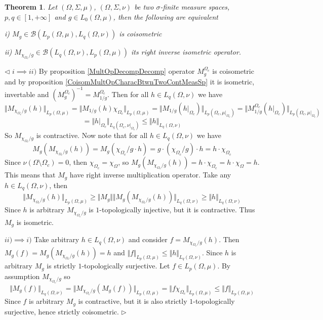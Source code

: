 \documentclass[12pt]{article}
\newtheorem{theorem}{Theorem}[subsection]
\newenvironment{proof}{\par $\triangleleft$}{$\triangleright$}
\begin{document}
\begin{theorem}\label{CoisomMultOpDescBtwnTwoMeasSp} Let $(\Omega,\Sigma,\mu)$, $(\Omega,\Sigma,\nu)$ be two $\sigma$-finite measure spaces, $p,q\in[1,+\infty]$ and $g\in L_0(\Omega,\mu)$, then the following are equivalent

i) $M_g\in\mathcal{B}(L_p(\Omega,\mu),L_q(\Omega,\nu))$ is coisometric

ii) $M_{\chi_{\Omega_c}/g}\in\mathcal{B}(L_q(\Omega,\nu), L_p(\Omega,\mu))$ its right inverse isometric operator.
\end{theorem}
\begin{proof}
$i\implies ii)$ By proposition \ref{MultOpDecompDecomp} operator $M_g^{\Omega_c}$ is coisometric and by proposition \ref{CoisomMultOpCharacBtwnTwoContMeasSp} it is isometric, invertable and $(M_g^{\Omega_c})^{-1}=M_{1/g}^{\Omega_c}$. Then for all $h\in L_q(\Omega,\nu)$ we have
$$
\Vert M_{\chi_{\Omega_c}/g}(h)\Vert_{L_p(\Omega,\mu)}=
\Vert M_{1/g}(h)\chi_{\Omega_c}\Vert_{L_p(\Omega,\mu)}=
\Vert M_{1/g}(h|_{\Omega_c})\Vert_{L_p(\Omega_c,\mu|_{\Omega_c})}=
\Vert M_{1/g}^{\Omega_c}(h|_{\Omega_c})\Vert_{L_p(\Omega_c,\mu|_{\Omega_c})}
$$
$$
=\Vert h|_{\Omega_c}\Vert_{L_q(\Omega_c,\nu|_{\Omega_c})}
\leq\Vert h\Vert_{L_q(\Omega,\nu)}
$$
So $M_{\chi_{\Omega_c}/g}$ is contractive. Now note that for all $h\in L_q(\Omega,\nu)$ we have
$$
M_g(M_{\chi_{\Omega_c}/g}(h))
=M_g(\chi_{\Omega_c}/g\cdot h)
=g\cdot(\chi_{\Omega_c}/g)\cdot  h
=h\cdot\chi_{\Omega_c}
$$
Since $\nu(\Omega\setminus\Omega_c)=0$, then $\chi_{\Omega_c}=\chi_{\Omega}$, so $M_g(M_{\chi_{\Omega_c}/g}(h))=h\cdot\chi_{\Omega_c}=h\cdot\chi_{\Omega}=h$. This means that $M_g$ have right inverse multiplication operator. Take any $h\in L_q(\Omega,\nu)$, then
$$
\Vert M_{\chi_{\Omega_c}/g}(h)\Vert_{L_p(\Omega,\mu)}
\geq\Vert M_g\Vert\Vert M_g(M_{\chi_{\Omega_c}/g}(h))\Vert_{L_q(\Omega,\nu)}
\geq\Vert h\Vert_{L_q(\Omega,\nu)}
$$
Since $h$ is arbitrary $M_{\chi_{\Omega_c}/g}$ is $1$-topologically injective, but it is contractive. Thus $M_g$ is isometric.

$ii)\implies i)$ Take arbitrary $h\in L_q(\Omega,\nu)$ and consider $f=M_{\chi_{\Omega_c}/g}(h)$. Then $M_g(f)=M_g(M_{\chi_{\Omega_c}/g}(h))=h$ and $\Vert f\Vert_{L_p(\Omega,\mu)}\leq\Vert h\Vert_{L_q(\Omega,\nu)}$. Since $h$ is arbitrary $M_g$ is strictly $1$-topologically surjective. Let $f\in L_p(\Omega,\mu)$. By assumption $M_{\chi_{\Omega_c}/g}$ so
$$
\Vert M_g(f)\Vert_{L_q(\Omega,\nu)}
=\Vert M_{\chi_{\Omega_c}/g}(M_g(f))\Vert_{L_p(\Omega,\mu)}
=\Vert f\chi_{\Omega_c}\Vert_{L_p(\Omega,\mu)}
\leq\Vert f\Vert_{L_p(\Omega,\mu)}
$$
Since $f$ is arbitrary $M_g$ is contractive, but it is also strictly $1$-topologically surjective, hence strictly coisometric.
\end{proof}
\newline
\end{document}
